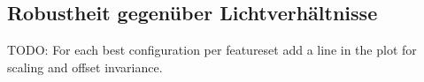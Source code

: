\subsection{Robustheit gegenüber Lichtverhältnisse}
\label{sec:brightness_eval}
TODO: For each best configuration per featureset add a line in the plot for scaling and offset invariance.
